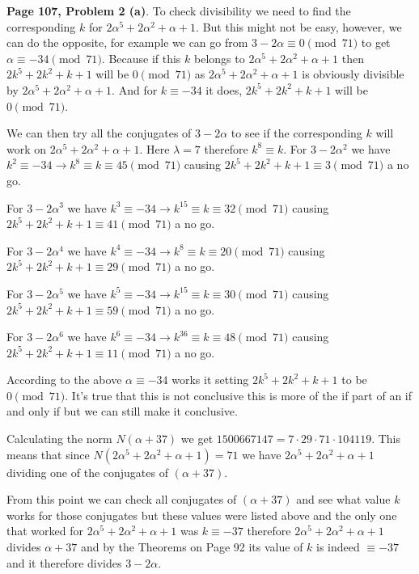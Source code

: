\documentclass[aps,preprint,preprintnumbers,nofootinbib,showpacs,prd]{revtex4-1}
\begin{document}
{\bf Page 107, Problem 2 (a)}. To check divisibility we need to find the corresponding $k$ for $2\alpha^5 + 2\alpha^2 + \alpha + 1$. But this might not be easy, however, we can do the opposite, for example we can go from $3 - 2\alpha \equiv 0 \pmod{71}$ to get $\alpha \equiv -34 \pmod{71}$. Because if this $k$ belongs to $2\alpha^5 + 2\alpha^2 + \alpha + 1$ then $2k^5 + 2k^2 + k + 1$ will be $0 \pmod{71}$ as $2\alpha^5 + 2\alpha^2 + \alpha + 1$ is obviously divisible by $2\alpha^5 + 2\alpha^2 + \alpha + 1$. And for $k \equiv -34$ it does, $2k^5 + 2k^2 + k + 1$ will be $0 \pmod{71}$.

We can then try all the conjugates of $3 - 2\alpha$ to see if the corresponding $k$ will work on $2\alpha^5 + 2\alpha^2 + \alpha + 1$. Here $\lambda = 7$ therefore $k^8 \equiv k$. For $3 - 2\alpha^2$ we have $k^2 \equiv -34 \to k^8 \equiv k \equiv 45 \pmod{71}$ causing $2k^5 + 2k^2 + k + 1 \equiv 3 \pmod{71}$ a no go.

For $3 - 2\alpha^3$ we have $k^3 \equiv -34 \to k^{15} \equiv k \equiv 32 \pmod{71}$ causing $2k^5 + 2k^2 + k + 1 \equiv 41 \pmod{71}$ a no go.

For $3 - 2\alpha^4$ we have $k^4 \equiv -34 \to k^{8} \equiv k \equiv 20 \pmod{71}$ causing $2k^5 + 2k^2 + k + 1 \equiv 29 \pmod{71}$ a no go.

For $3 - 2\alpha^5$ we have $k^5 \equiv -34 \to k^{15} \equiv k \equiv 30 \pmod{71}$ causing $2k^5 + 2k^2 + k + 1 \equiv 59 \pmod{71}$ a no go.

For $3 - 2\alpha^6$ we have $k^6 \equiv -34 \to k^{36} \equiv k \equiv 48 \pmod{71}$ causing $2k^5 + 2k^2 + k + 1 \equiv 11 \pmod{71}$ a no go.

According to the above $\alpha \equiv -34$ works it setting $2k^5 + 2k^2 + k + 1$ to be $0 \pmod{71}$. It's true that this is not conclusive this is more of the if part of an if and only if but we can still make it conclusive. 

Calculating the norm $N(\alpha + 37)$ we get $1500667147 = 7 \cdot 29 \cdot 71 \cdot 104119$. This means that since $N(2\alpha^5 + 2\alpha^2 + \alpha + 1) = 71$ we have $2\alpha^5 + 2\alpha^2 + \alpha + 1$ dividing one of the conjugates of $(\alpha + 37)$.

From this point we can check all conjugates of $(\alpha + 37)$ and see what value $k$ works for those conjugates but these values were listed above and the only one that worked for $2\alpha^5 + 2\alpha^2 + \alpha + 1$ was $k \equiv -37$ therefore $2\alpha^5 + 2\alpha^2 + \alpha + 1$ divides $\alpha + 37$ and by the Theorems on Page 92 its value of $k$ is indeed $\equiv -37$ and it therefore divides $3 - 2\alpha$.
\end{document}
